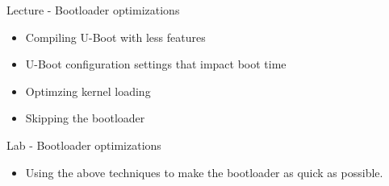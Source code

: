 \documentclass[a4paper,12pt,obeyspaces,spaces,hyphens]{article}
\begin{document}
\feagendatwocolumn
{Lecture - Bootloader optimizations}
{
  \begin{itemize}
  \item Compiling U-Boot with less features
  \item U-Boot configuration settings that impact boot time
  \item Optimzing kernel loading
  \item Skipping the bootloader
  \end{itemize}
}
{Lab - Bootloader optimizations}
{
 \begin{itemize}
 \item Using the above techniques to make the bootloader
 as quick as possible.
 \end{itemize}
}
\end{document}
